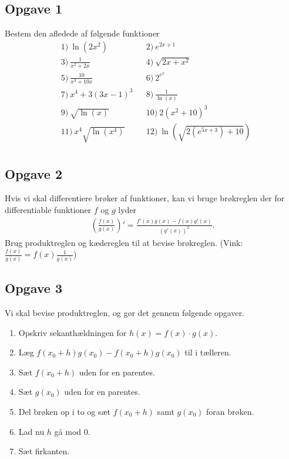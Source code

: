 \subsection*{Opgave 1}
Bestem den afledede af følgende funktioner
\begin{align*}
&1) \  \ln(2x^2)   &&2) \  e^{2x+1}   \\
&3) \  \frac{1}{x^2+2x}  &&4) \  \sqrt{2x+x^2}   \\
&5) \  \frac{10}{x^3+10x}   &&6) \ 2^{e^x}    \\
&7) \  x^4+3(3x-1)^3   &&8) \  \frac{1}{\ln(x)}   \\
&9) \   \sqrt{\ln(x)}  &&10) \ 2(x^2+10)^3   \\
&11) \   x^4\sqrt{\ln(x^4)}  &&12) \  \ln(\sqrt{2(e^{5x+3})+10})  \\
\end{align*}

\newpage

\subsection*{Opgave 2}
Hvis vi skal differentiere brøker af funktioner, kan vi bruge brøkreglen der for differentiable funktioner $f$ og $g$ lyder
\begin{align*}
	\left(\frac{f(x)}{g(x)}\right)' = \frac{f'(x)g(x) - f(x)g'(x)}{(g'(x))^2}.
\end{align*}
Brug produktreglen og kædereglen til at bevise brøkreglen. (Vink: $\frac{f(x)}{g(x)} = f(x)\frac{1}{g(x)}$)

\subsection*{Opgave 3}
Vi skal bevise produktreglen, og gør det gennem følgende opgaver.
\begin{enumerate}[label=\roman*)]
	\item Opskriv sekanthældningen for $h(x) = f(x)\cdot g(x)$. 
	\item Læg $f(x_0 + h)g(x_0) - f(x_0 + h)g(x_0)$ til i tælleren. 
	\item Sæt $f(x_0 + h)$ uden for en parentes.
	\item Sæt $g(x_0)$ uden for en parentes.
	\item Del brøken op i to og sæt $f(x_0 + h)$ samt $g(x_0)$ foran brøken.
	\item Lad nu $h$ gå mod $0$.
	\item Sæt firkanten.
\end{enumerate}

